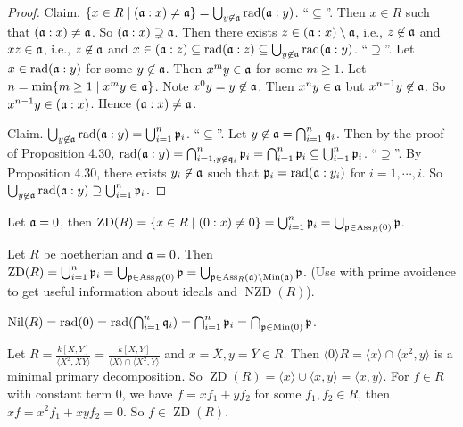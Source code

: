 \begin{proof}
    Claim. $\{x \in R \mid (\mathfrak{a}:x) \neq \mathfrak{a}\} = \bigcup_{y \not\in \mathfrak{a}} \operatorname{rad}(\mathfrak{a}:y)$. ``$\subseteq$''. Then $x \in R$ such that $(\mathfrak{a}:x) \neq \mathfrak{a}$. So $(\mathfrak{a}:x) \supsetneq \mathfrak{a}$. Then there exists $z \in (\mathfrak{a}:x) \setminus \mathfrak{a}$, i.e., $z \not \in \mathfrak{a}$ and $xz \in \mathfrak{a}$, i.e., $z \not \in \mathfrak{a}$ and $x \in (\mathfrak{a}:z) \subseteq \operatorname{rad}(\mathfrak{a}:z) \subseteq \bigcup_{y \not\in \mathfrak{a}} \operatorname{rad}(\mathfrak{a}:y)$. ``$\supseteq$''. Let $x \in \operatorname{rad}(\mathfrak{a}:y)$ for some $y \not\in \mathfrak{a}$. Then $x^{m}y \in \mathfrak{a}$ for some $m \geq 1$. Let $n = \min\{m \geq 1 \mid x^{m}y \in \mathfrak{a}\}$. Note $x^{0}y = y \not \in \mathfrak{a}$. Then $x^{n}y \in \mathfrak{a}$ but $x^{n-1}y \not \in \mathfrak{a}$. So $x^{n-1}y \in (\mathfrak{a}:x)$. Hence $(\mathfrak{a}:x) \neq \mathfrak{a}$. \par
    Claim. $\bigcup_{y \not\in \mathfrak{a}} \operatorname{rad}(\mathfrak{a}:y) = \bigcup_{i=1}^{n}\mathfrak{p}_i$. ``$\subseteq$''. Let $y \not\in \mathfrak{a} = \bigcap_{i=1}^{n} \mathfrak{q}_i$. Then by the proof of Proposition 4.30, $\operatorname{rad}(\mathfrak{a}:y) = \bigcap_{i=1,y \not \in \mathfrak{q}_i}^{n} \mathfrak{p}_i = \bigcap_{i=1}^{n} \mathfrak{p}_i \subseteq \bigcup_{i=1}^{n}\mathfrak{p}_i$. ``$\supseteq$''. By Proposition 4.30, there exists $y_i \not \in \mathfrak{a}$ such that $\mathfrak{p}_i = \operatorname{rad}(\mathfrak{a}:y_i)$ for $i = 1,\cdots,i$. So $\bigcup_{y \not\in \mathfrak{a}} \operatorname{rad}(\mathfrak{a}:y) \supseteq \bigcup_{i=1}^{n} \mathfrak{p}_i$. 
\end{proof}

\begin{corollary}
    Let $\mathfrak{a} = 0$, then $\operatorname{ZD}(R) = \{x \in R \mid (0:x) \neq 0\} = \bigcup_{i=1}^{n} \mathfrak{p}_i = \bigcup_{\mathfrak{p} \in \operatorname{Ass}_R(0)}\mathfrak{p}$.
\end{corollary}

\begin{summary}
    Let $R$ be noetherian and $\mathfrak{a} = 0$. Then $\operatorname{ZD}(R) = \bigcup_{i=1}^{n} \mathfrak{p}_i = \bigcup_{\mathfrak{p} \in \operatorname{Ass}_R(0)}\mathfrak{p} = \bigcup_{\mathfrak{p} \in \operatorname{Ass}_R(\mathfrak{a}) \setminus \operatorname{Min}(\mathfrak{a})} \mathfrak{p}$. (Use with prime avoidence to get useful information about ideals and $\operatorname{NZD}(R)$). \par 
    $\operatorname{Nil}(R) = \operatorname{rad}(0) = \operatorname{rad}(\bigcap_{i=1}^{n}\mathfrak{q}_i) = \bigcap_{i=1}^{n} \mathfrak{p}_i = \bigcap_{\mathfrak{p} \in \operatorname{Min}(0)} \mathfrak{p}$.
\end{summary}

\begin{example*}
    Let $R = \frac{k[X,Y]}{\langle X^{2},XY \rangle} = \frac{k[X,Y]}{\langle X \rangle \cap \langle X^{2},Y \rangle}$ and $x = \overbar{X}, y= \overbar{Y} \in R$. Then $\langle 0 \rangle R = \langle x \rangle \cap \langle x^{2}, y \rangle$ is a minimal primary decomposition. So $\operatorname{ZD}(R) = \langle x \rangle \cup \langle x, y \rangle = \langle x, y \rangle$. For $f \in R$ with constant term 0, we have $f = xf_1 + yf_2$ for some $f_1,f_2 \in R$, then $xf = x^{2}f_1 + xyf_2 = 0$. So $f \in \operatorname{ZD}(R)$.
\end{example*}

